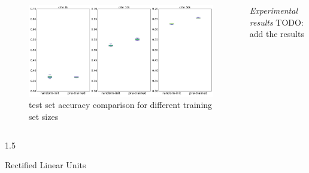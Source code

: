\documentclass[final]{beamer}
\newlength{\onecolwid}
\newlength{\threecolwid}
\begin{document}
\begin{frame}[t]
\begin{columns}[t]
\begin{column}{\threecolwid}
\begin{columns}[t, totalwidth=\threecolwid]
\begin{column}{\onecolwid}
\begin{block}{}
\begin{figure}
\includegraphics[width=\linewidth]{box_plots/boxplots_cifar.png}
\caption{test set accuracy comparison for different training set sizes}
\end{figure}

\end{block}
\end{column}

\begin{column}{\onecolwid}
\begin{block}{}
\emph{Experimental results}
TODO: add the results
\end{block}



\end{column}
\end{columns}



\begin{columns}[t, totalwidth=\threecolwid]
\begin{column}{1.5\onecolwid}

\begin{block}{Rectified Linear Units}

	\begin{figure}
		\centering

		\begin{subfigure}{0.4\linewidth}


\end{subfigure}
\end{figure}
\end{block}
\end{column}
\end{columns}
\end{column}
\end{columns}
\end{frame}
\end{document}
